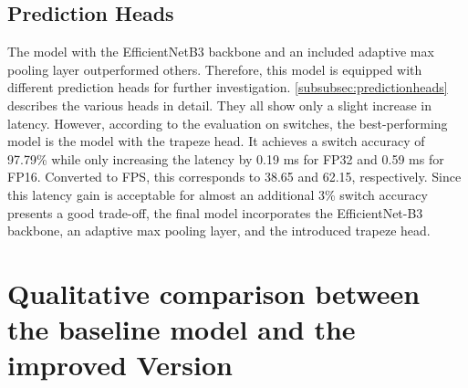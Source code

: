 \subsection{Prediction Heads}

\begin{table}[H]
    \centering
    \caption{Prediction Heads Results}
    \label{tab:predHeadsResults}
\end{table}

The model with the EfficientNetB3 backbone and an included adaptive max pooling layer outperformed others.
Therefore, this model is equipped with different prediction heads for further investigation.
\autoref{subsubsec:predictionheads} describes the various heads in detail.
They all show only a slight increase in latency.
However, according to the evaluation on switches, the best-performing model is the model with the trapeze head.
It achieves a switch accuracy of 97.79\% while only increasing the latency by 0.19 ms for FP32 and 0.59 ms for FP16.
Converted to \ac{FPS}, this corresponds to 38.65 and 62.15, respectively.
Since this latency gain is acceptable for almost an additional 3\% switch accuracy presents a good trade-off, the final model incorporates the EfficientNet-B3 backbone, an adaptive max pooling layer, and the introduced trapeze head.

\section{Qualitative comparison between the baseline model and the improved Version}
\label{sec:qualitativeComparison}

